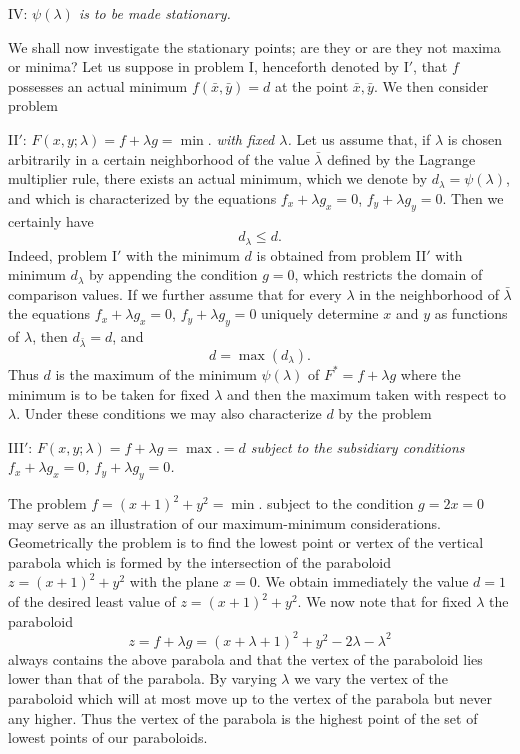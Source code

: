 IV: \emph{$\psi(\lambda)$ is to be made stationary.}

We shall now investigate the stationary points; are they or are they not maxima or minima? Let us suppose in problem I, henceforth denoted by I$'$, that $f$ possesses an actual minimum $f(\bar x,\bar y)=d$ at the point $\bar x,\bar y$. We then consider problem

II$'$: \emph{$F(x,y;\lambda)=f+\lambda g=\min.$ with fixed $\lambda$.} Let us assume that, if $\lambda$ is chosen arbitrarily in a certain neighborhood of the value $\bar\lambda$ defined by the Lagrange multiplier rule, there exists an actual minimum, which we denote by $d_\lambda=\psi(\lambda)$, and which is characterized by the equations $f_x+\lambda g_x=0$, $f_y+\lambda g_y=0$. Then we certainly have
\[
d_\lambda\le d.
\]
Indeed, problem I$'$ with the minimum $d$ is obtained from problem II$'$ with minimum $d_\lambda$ by appending the condition $g=0$, which restricts the domain of comparison values. If we further assume that for every $\lambda$ in the neighborhood of $\bar\lambda$ the equations $f_x+\lambda g_x=0$, $f_y+\lambda g_y=0$ uniquely determine $x$ and $y$ as functions of $\lambda$, then $d_{\bar\lambda}=d$, and
\[
d=\max(d_\lambda).
\]
Thus $d$ is the maximum of the minimum $\psi(\lambda)$ of $F^*=f+\lambda g$ where the minimum is to be taken for fixed $\lambda$ and then the maximum taken with respect to $\lambda$. Under these conditions we may also characterize $d$ by the problem

III$'$: \emph{$F(x,y;\lambda)=f+\lambda g=\max.=d$ subject to the subsidiary conditions $f_x+\lambda g_x=0$, $f_y+\lambda g_y=0$.}

The problem $f=(x+1)^2+y^2=\min.$ subject to the condition $g=2x=0$ may serve as an illustration of our maximum-minimum considerations. Geometrically the problem is to find the lowest point or vertex of the vertical parabola which is formed by the intersection of the paraboloid $z=(x+1)^2+y^2$ with the plane $x=0$. We obtain immediately the value $d=1$ of the desired least value of $z=(x+1)^2+y^2$. We now note that for fixed $\lambda$ the paraboloid
\[
z=f+\lambda g=(x+\lambda+1)^2+y^2-2\lambda-\lambda^2
\]
always contains the above parabola and that the vertex of the paraboloid lies lower than that of the parabola. By varying $\lambda$ we vary the vertex of the paraboloid which will at most move up to the vertex of the parabola but never any higher. Thus the vertex of the parabola is the highest point of the set of lowest points of our paraboloids.


